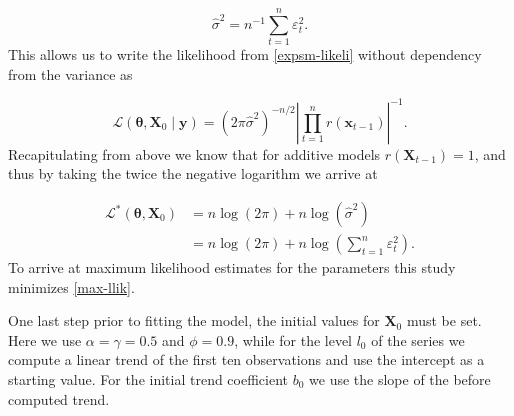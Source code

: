 \begin{equation}
	\hat{\sigma}^{2}=n^{-1} \sum_{t=1}^{n} \varepsilon_{t}^{2}.
\end{equation}
%
This allows us to write the likelihood from \ref{expsm-likeli} without dependency from the variance as 

\begin{equation}
	\mathcal{L}\left(\boldsymbol{\theta}, \boldsymbol{X}_{0} \mid \boldsymbol{y}\right)=\left(2 \pi  \hat{\sigma}^{2}\right)^{-n / 2}\left|\prod_{t=1}^{n} r\left(\boldsymbol{x}_{t-1}\right)\right|^{-1}.
\end{equation}
%
Recapitulating from above we know that for additive models $r(\boldsymbol{X}_{t-1}) = 1$, and thus by taking the twice the negative logarithm we arrive at

\begin{equation}
	\label{max-llik}
	\begin{array}{rl}
	\mathcal{L}^{*}\left(\boldsymbol{\theta}, \boldsymbol{X}_{0}\right)&= n \log \left(2 \pi \right) + n \log \left( \hat{\sigma}^2	 \right) \\
	&= n \log \left(2 \pi \right) + n \log \left( \displaystyle \sum_{t=1}^{n} \varepsilon_{t}^{2}\right).
	\end{array}
\end{equation}
%
To arrive at maximum likelihood estimates for the parameters this study minimizes \ref{max-llik}.

One last step prior to fitting the model, the initial values for $\boldsymbol{X}_0$ must be set. Here we use $\alpha = \gamma = 0.5$ and $\phi = 0.9$, while for the level $l_0$ of the series we compute a linear trend of the first ten observations and use the intercept as a starting value. For the initial trend  coefficient $b_0$ we use the slope of the before computed trend.






















